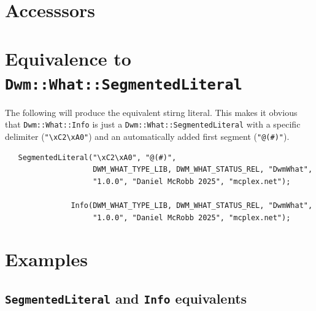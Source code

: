 \documentclass[letterpaper,openany]{book}
\begin{document}
\section{Accesssors}

\section{Equivalence to \texttt{Dwm::What::SegmentedLiteral}}
The following will produce the equivalent stirng literal.  This makes
it obvious that \texttt{Dwm::What::Info} is just a
\texttt{Dwm::What::SegmentedLiteral} with a specific delimiter
(\texttt{"\textbackslash{xC2}\textbackslash{xA0}"}) and an automatically added first segment
(\texttt{"@(\#)"}).

\begin{verbatim}
   SegmentedLiteral("\xC2\xA0", "@(#)",
                    DWM_WHAT_TYPE_LIB, DWM_WHAT_STATUS_REL, "DwmWhat",
                    "1.0.0", "Daniel McRobb 2025", "mcplex.net");

               Info(DWM_WHAT_TYPE_LIB, DWM_WHAT_STATUS_REL, "DwmWhat",
                    "1.0.0", "Daniel McRobb 2025", "mcplex.net");
\end{verbatim}

\section{Examples}


\subsection{\texttt{SegmentedLiteral} and \texttt{Info} equivalents}



\end{document}
